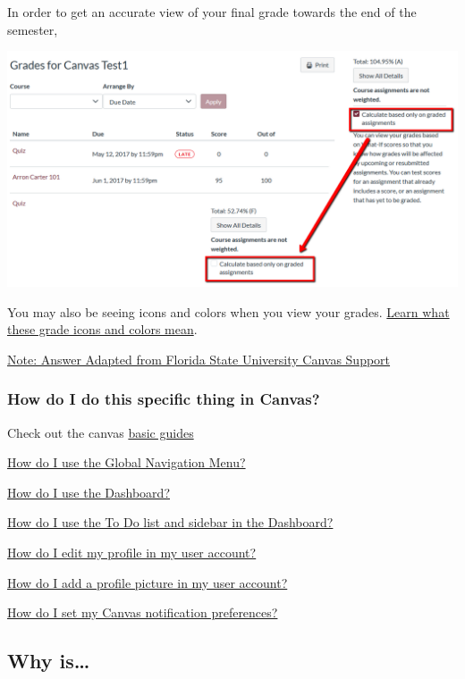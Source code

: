 \documentclass[
]{book}
\begin{document}
In order to get an accurate view of your final grade towards the end of the semester,

\begin{center}\includegraphics[width=0.5\linewidth]{img/grades} \end{center}

You may also be seeing icons and colors when you view your grades. \href{https://community.canvaslms.com/docs/DOC-16533-4212829283}{Learn what these grade icons and colors mean}.

\href{https://support.canvas.fsu.edu/kb/article/1068-students-make-sure-you-are-seeing-the-right-grades-in-canvas/}{Note: Answer Adapted from Florida State University Canvas Support}

\hypertarget{how-do-i-do-this-specific-thing-in-canvas}{%
\subsubsection{How do I do this specific thing in Canvas?}\label{how-do-i-do-this-specific-thing-in-canvas}}

Check out the canvas \href{https://community.canvaslms.com/t5/Canvas-Basics-Guide/tkb-p/basics}{basic guides}

\href{https://community.canvaslms.com/docs/DOC-10603-4212710332}{How do I use the Global Navigation Menu?}

\href{https://community.canvaslms.com/docs/DOC-10587-4212710330}{How do I use the Dashboard?}

\href{https://community.canvaslms.com/docs/DOC-10589-4212717407}{How do I use the To Do list and sidebar in the Dashboard?}

\href{https://community.canvaslms.com/docs/DOC-10628-4212710342}{How do I edit my profile in my user account?}

\href{https://community.canvaslms.com/docs/DOC-10599-4212710334}{How do I add a profile picture in my user account?}

\href{https://community.canvaslms.com/docs/DOC-10624-4212710344}{How do I set my Canvas notification preferences?}

\hypertarget{why-is}{%
\subsection{Why is\ldots{}}\label{why-is}}
\end{document}
